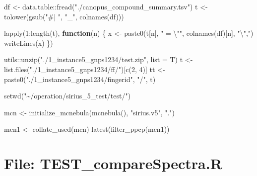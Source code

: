 \documentclass[
]{article}
\newenvironment{Shaded}{\begin{snugshade}}{\end{snugshade}}
\newcommand{\AttributeTok}[1]{\textcolor[rgb]{0.77,0.63,0.00}{#1}}
\newcommand{\ControlFlowTok}[1]{\textcolor[rgb]{0.13,0.29,0.53}{\textbf{#1}}}
\newcommand{\DecValTok}[1]{\textcolor[rgb]{0.00,0.00,0.81}{#1}}
\newcommand{\FunctionTok}[1]{\textcolor[rgb]{0.00,0.00,0.00}{#1}}
\newcommand{\NormalTok}[1]{#1}
\newcommand{\OtherTok}[1]{\textcolor[rgb]{0.56,0.35,0.01}{#1}}
\newcommand{\SpecialCharTok}[1]{\textcolor[rgb]{0.00,0.00,0.00}{#1}}
\newcommand{\StringTok}[1]{\textcolor[rgb]{0.31,0.60,0.02}{#1}}
\begin{document}
\begin{Shaded}
\begin{Highlighting}[]
\NormalTok{df }\OtherTok{\textless{}{-}}\NormalTok{ data.table}\SpecialCharTok{::}\FunctionTok{fread}\NormalTok{(}\StringTok{"./canopus\_compound\_summary.tsv"}\NormalTok{)}
\NormalTok{t }\OtherTok{\textless{}{-}} \FunctionTok{tolower}\NormalTok{(}\FunctionTok{gsub}\NormalTok{(}\StringTok{"\#| "}\NormalTok{, }\StringTok{"\_"}\NormalTok{, }\FunctionTok{colnames}\NormalTok{(df)))}

\FunctionTok{lapply}\NormalTok{(}\DecValTok{1}\SpecialCharTok{:}\FunctionTok{length}\NormalTok{(t),}
  \ControlFlowTok{function}\NormalTok{(n) \{}
\NormalTok{    x }\OtherTok{\textless{}{-}} \FunctionTok{paste0}\NormalTok{(t[n], }\StringTok{" = }\SpecialCharTok{\textbackslash{}"}\StringTok{"}\NormalTok{, }\FunctionTok{colnames}\NormalTok{(df)[n], }\StringTok{"}\SpecialCharTok{\textbackslash{}"}\StringTok{,"}\NormalTok{)}
    \FunctionTok{writeLines}\NormalTok{(x)}
\NormalTok{  \})}

\NormalTok{utils}\SpecialCharTok{::}\FunctionTok{unzip}\NormalTok{(}\StringTok{"./1\_instance5\_gnps1234/test.zip"}\NormalTok{, }\AttributeTok{list =}\NormalTok{ T)}
\NormalTok{t }\OtherTok{\textless{}{-}} \FunctionTok{list.files}\NormalTok{(}\StringTok{"./1\_instance5\_gnps1234/ff/"}\NormalTok{)[}\FunctionTok{c}\NormalTok{(}\DecValTok{2}\NormalTok{, }\DecValTok{4}\NormalTok{)]}
\NormalTok{tt }\OtherTok{\textless{}{-}} \FunctionTok{paste0}\NormalTok{(}\StringTok{"./1\_instance5\_gnps1234/fingerid"}\NormalTok{, }\StringTok{"/"}\NormalTok{, t)}



\FunctionTok{setwd}\NormalTok{(}\StringTok{"\textasciitilde{}/operation/sirius\_5\_test/test/"}\NormalTok{)}

\NormalTok{mcn }\OtherTok{\textless{}{-}} \FunctionTok{initialize\_mcnebula}\NormalTok{(}\FunctionTok{mcnebula}\NormalTok{(), }\StringTok{"sirius.v5"}\NormalTok{, }\StringTok{"."}\NormalTok{)}

\NormalTok{mcn1 }\OtherTok{\textless{}{-}} \FunctionTok{collate\_used}\NormalTok{(mcn)}
\FunctionTok{latest}\NormalTok{(}\FunctionTok{filter\_ppcp}\NormalTok{(mcn1))}
\end{Highlighting}
\end{Shaded}

\hypertarget{file-test_comparespectra.r}{%
\section{File: TEST\_compareSpectra.R}\label{file-test_comparespectra.r}}
\end{document}
